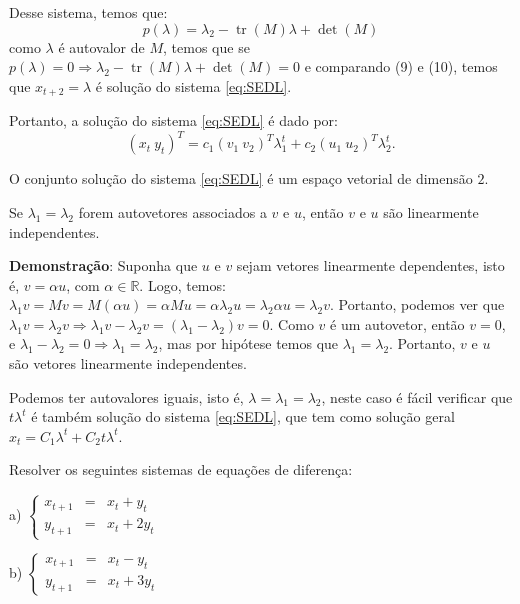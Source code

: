 Desse sistema, temos que:
\begin{equation}\label{eq:polinomiocaracteristicoM}
p(\lambda) = \lambda_{2} - \operatorname{tr}(M) \lambda + \det(M)
\end{equation}
como $\lambda$ é autovalor de $M$, temos que se $p(\lambda)=0 \Rightarrow \lambda_{2} - \operatorname{tr} (M) \lambda + \det(M) = 0$ e comparando (9) e (10), temos que $x_{t+2} = \lambda$ é solução do sistema \eqref{eq:SEDL}.

Portanto, a solução do sistema \eqref{eq:SEDL} é dado por:
$$(x_{t} \ y_{t})^T = c_1 (v_1\ v_2)^T \lambda_{1}^{t} + c_2 (u_1 \ u_2)^T \lambda_{2}^{t}.$$



\begin{proposition}
O conjunto solução do sistema \eqref{eq:SEDL} é um espaço vetorial de dimensão $2$. 
\end{proposition}

\begin{proposition}
Se $\lambda_{1} = \lambda_{2}$ forem autovetores associados a $v$ e $u$, então $v$ e $u$ são linearmente independentes.
\end{proposition}

\textbf{Demonstração}: Suponha que $u$ e $v$ sejam vetores linearmente dependentes, isto é, $v = \alpha u$, com $\alpha \in \mathbb{R}$. Logo, temos: $\lambda_{1}v = Mv = M(\alpha u) = \alpha M u = \alpha \lambda_{2} u = \lambda_{2} \alpha u = \lambda_{2} v$. Portanto, podemos ver que $\lambda_{1} v = \lambda_{2} v \Rightarrow  \lambda_{1} v - \lambda_{2}v = (\lambda_{1} - \lambda_{2})v = 0$. Como $v$ é um autovetor, então $v = 0$, e $\lambda_{1} - \lambda_{2} = 0 \Rightarrow  \lambda_{1} = \lambda_{2}$, mas por hipótese temos que $\lambda_{1} = \lambda_{2}$. Portanto, $v$ e $u$ são vetores linearmente independentes. 

\begin{remark}
Podemos ter autovalores iguais, isto é, $\lambda = \lambda_{1} = \lambda_{2}$, neste caso é fácil verificar que $t\lambda^{t}$ é também solução do sistema \eqref{eq:SEDL}, que tem como solução geral $x_{t} = C_1\lambda^{t} + C_2t\lambda^{t}$.
\end{remark}


\begin{example}
Resolver os seguintes sistemas de equações de diferença: 

a) $\left\{\begin{array}{rcl} x_{t+1} &=& x_{t} + y_{t} \\ y_{t+1} &=& x_{t} + 2y_{t} \end{array}\right.$

b) $\left\{\begin{array}{rcl} x_{t+1} &=& x_{t} - y_{t} \\ y_{t+1} &=& x_{t} + 3y_{t} \end{array}\right.$
\end{example}


